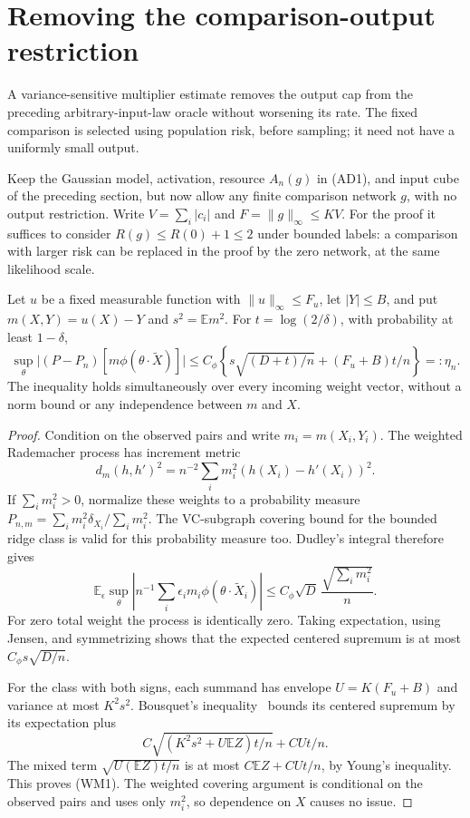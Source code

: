 \section{Removing the comparison-output restriction}
\label{sec:risk-weighted-multiplier}
A variance-sensitive multiplier estimate removes the output cap from the
preceding arbitrary-input-law oracle without worsening its rate.
The fixed comparison is selected using population risk, before sampling;
it need not have a uniformly small output.

Keep the Gaussian model, activation, resource $A_n(g)$ in (AD1), and
input cube of the preceding section, but now allow any finite
comparison network $g$, with no output restriction. Write
$V=\sum_i|c_i|$ and $F=\|g\|_\infty\le K V$.
For the proof it suffices to consider $R(g)\le R(0)+1\le2$ under
bounded labels: a comparison with larger risk can be replaced in the
proof by the zero network, at the same likelihood scale.

\begin{lemma}
\label{lem:risk-weighted-ridge}
Let $u$ be a fixed measurable function with $\|u\|_\infty\le F_u$,
let $|Y|\le B$, and put
$m(X,Y)=u(X)-Y$ and $s^2=\mathbb E m^2$.
For $t=\log(2/\delta)$, with probability at least $1-\delta$,
\[
 \sup_\theta\bigl|(P-P_n)[m\phi(\theta\cdot\widetilde X)]\bigr|
 \le C_\phi\left\{
       s\sqrt{(D+t)/n}+(F_u+B)t/n\right\}=:\eta_n.       \tag{WM1}
\]
The inequality holds simultaneously over every incoming weight vector,
without a norm bound or any independence between $m$ and $X$.
\end{lemma}
\begin{proof}
Condition on the observed pairs and write $m_i=m(X_i,Y_i)$.
The weighted Rademacher process has increment metric
\[
 d_m(h,h')^2=n^{-2}\sum_i m_i^2(h(X_i)-h'(X_i))^2.
\]
If $\sum_i m_i^2>0$, normalize these weights to a probability measure
$P_{n,m}=\sum_i m_i^2\delta_{X_i}/\sum_i m_i^2$.
The VC-subgraph covering bound for the bounded ridge class is valid for
this probability measure too. Dudley's integral therefore gives
\[
 \mathbb E_\epsilon\sup_\theta
 \left|n^{-1}\sum_i\epsilon_i m_i\phi(\theta\cdot\widetilde X_i)\right|
 \le C_\phi\sqrt D\,\frac{\sqrt{\sum_i m_i^2}}n.
\]
For zero total weight the process is identically zero. Taking expectation,
using Jensen, and symmetrizing shows that the expected centered supremum
is at most $C_\phi s\sqrt{D/n}$.

For the class with both signs, each summand has envelope
$U=K(F_u+B)$ and variance at most $K^2s^2$.
Bousquet's inequality~\cite[Theorem~2.3]{bousquet} bounds its centered supremum by its expectation
plus
\[
 C\sqrt{(K^2s^2+U\mathbb E Z)t/n}+CUt/n.
\]
The mixed term $\sqrt{U(\mathbb E Z)t/n}$ is at most
$C\mathbb E Z+CUt/n$, by Young's inequality.
This proves (WM1). The weighted covering argument is conditional on the
observed pairs and uses only $m_i^2$, so dependence on $X$ causes no issue.
\end{proof}

